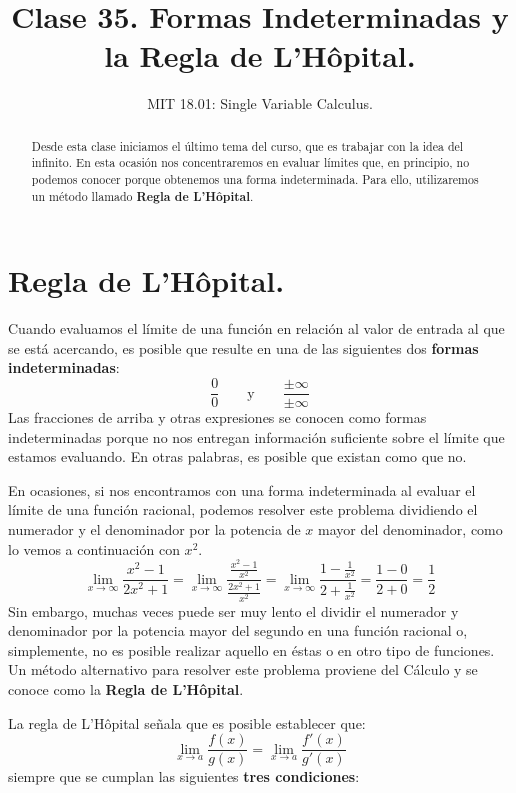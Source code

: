 \documentclass[12pt]{article}
\title{Clase 35. Formas Indeterminadas y la Regla de L'Hôpital.}
\author{MIT 18.01: Single Variable Calculus.}
\date{}
\begin{document}
\maketitle

\begin{abstract}
\noindent Desde esta clase iniciamos el último tema del curso, que es trabajar con la idea del infinito. En esta ocasión nos concentraremos en evaluar límites que, en principio, no podemos conocer porque obtenemos una forma indeterminada. Para ello, utilizaremos un método llamado \textbf{Regla de L'Hôpital}.
\end{abstract}


\section{Regla de L'Hôpital.}

Cuando evaluamos el límite de una función en relación al valor de entrada al que se está acercando, es posible que resulte en una de las siguientes dos \textbf{formas indeterminadas}:
\[
  \frac{0}{0} \qquad \text{y} \qquad \frac{\pm \infty}{\pm \infty}
\]
Las fracciones de arriba y otras expresiones se conocen como formas indeterminadas porque no nos entregan información suficiente sobre el límite que estamos evaluando. En otras palabras, es posible que existan como que no.

En ocasiones, si nos encontramos con una forma indeterminada al evaluar el límite de una función racional, podemos resolver este problema dividiendo el numerador y el denominador por la potencia de $x$ mayor del denominador, como lo vemos a continuación con $x^{2}$.
\[
  \lim_{x \to \infty} \frac{x^{2} - 1}{2x^{2} + 1} = \lim_{x \to \infty} \frac{\displaystyle \frac{x^{2} - 1}{x^{2}}}{\displaystyle \frac{2x^{2}+1}{x^{2}}}
                                                   = \lim_{x \to \infty} \frac{1 - \displaystyle \frac{1}{x^{2}}}{2 + \displaystyle \frac{1}{x^{2}}}
                                                   = \frac{1 - 0}{2 + 0}
                                                   = \frac{1}{2}
\]
Sin embargo, muchas veces puede ser muy lento el dividir el numerador y denominador por la potencia mayor del segundo en una función racional o, simplemente, no es posible realizar aquello en éstas o en otro tipo de funciones. Un método alternativo para resolver este problema proviene del Cálculo y se conoce como la \textbf{Regla de L'Hôpital}.

La regla de L'Hôpital señala que es posible establecer que:
\[
  \lim_{x \to a} \frac{f(x)}{g(x)} = \lim_{x \to a} \frac{f'(x)}{g'(x)}
\]
siempre que se cumplan las siguientes \textbf{tres condiciones}:
\end{document}
